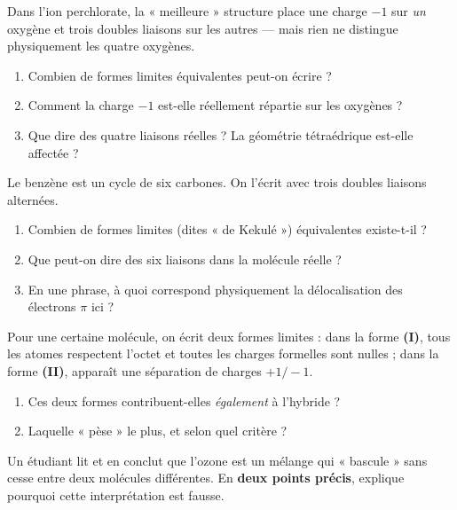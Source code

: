 \documentclass[11pt,a4paper]{article}
\begin{document}
\newcommand{\AX}[2]{\ensuremath{\mathrm{AX_{#1}E_{#2}}}}
\begin{exo}
Dans l'ion perchlorate, la « meilleure » structure place une charge $-1$ sur \emph{un} oxygène et
trois doubles liaisons sur les autres — mais rien ne distingue physiquement les quatre oxygènes.
\begin{enumerate}[label=\alph*)]
  \item Combien de formes limites équivalentes peut-on écrire ?
  \item Comment la charge $-1$ est-elle réellement répartie sur les oxygènes ?
  \item Que dire des quatre liaisons  réelles ? La géométrie tétraédrique est-elle affectée ?
\end{enumerate}
\end{exo}

\begin{exo}[le benzène \ce{C6H6}]
Le benzène est un cycle de six carbones. On l'écrit avec trois doubles liaisons alternées.
\begin{enumerate}[label=\alph*)]
  \item Combien de formes limites (dites « de Kekulé ») équivalentes existe-t-il ?
  \item Que peut-on dire des six liaisons  dans la molécule réelle ?
  \item En une phrase, à quoi correspond physiquement la délocalisation des électrons $\pi$ ici ?
\end{enumerate}
\end{exo}

\begin{exo}
Pour une certaine molécule, on écrit deux formes limites : dans la forme \textbf{(I)}, tous les
atomes respectent l'octet et toutes les charges formelles sont nulles ; dans la forme \textbf{(II)},
apparaît une séparation de charges $+1 / -1$.
\begin{enumerate}[label=\alph*)]
  \item Ces deux formes contribuent-elles \emph{également} à l'hybride ?
  \item Laquelle « pèse » le plus, et selon quel critère ?
\end{enumerate}
\end{exo}

\begin{exo}
Un étudiant lit  et en conclut que l'ozone est un mélange qui « bascule » sans
cesse entre deux molécules différentes. En \textbf{deux points précis}, explique pourquoi cette
interprétation est fausse.
\end{exo}
\end{document}
